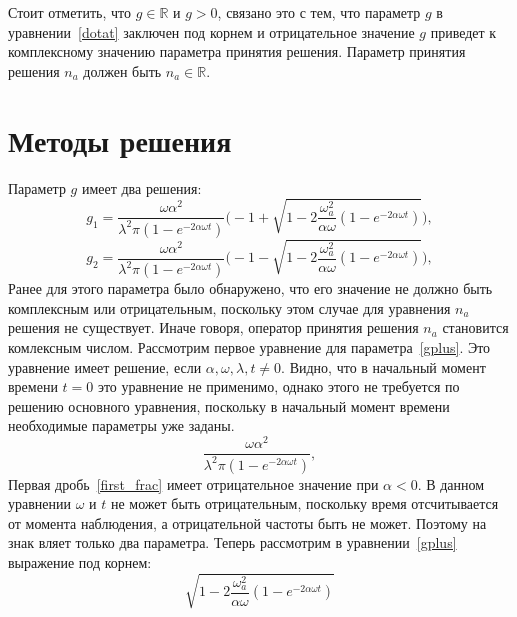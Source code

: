 Стоит отметить, что $g \in \mathbb{R}$ и $g > 0$, связано это с тем, что параметр $g$ в уравнении~\eqref{dotat}
заключен под корнем и отрицательное значение $g$ приведет к комплексному значению параметра принятия решения.
Параметр принятия решения $n_a$ должен быть $n_a \in \mathbb{R}$.

\section{Методы решения}

Параметр $g$ имеет два решения:
\begin{equation}\label{gplus}
    g_{1} = \frac{\omega \alpha^{2}}{\lambda^{2} \pi (1-e^{-2 \alpha \omega t})}
    \Biggl( -1 + \sqrt{1 - 2 \frac{\omega^{2}_{a} }{\alpha \omega} (1-e^{-2 \alpha \omega t})} \Biggr),
\end{equation}
\begin{equation}\label{gminus}
    g_{2} = \frac{\omega \alpha^{2}}{\lambda^{2} \pi (1-e^{-2 \alpha \omega t})}
    \Biggl( -1 - \sqrt{1 - 2 \frac{\omega^{2}_{a} }{\alpha \omega} (1-e^{-2 \alpha \omega t})} \Biggr),
\end{equation}
Ранее для этого параметра было обнаружено, что его значение не должно быть комплексным или отрицательным,
поскольку этом случае для уравнения $n_{a}$ решения не существует.
Иначе говоря, оператор принятия решения $n_{a}$ становится комлексным числом.
Рассмотрим первое уравнение для параметра~\eqref{gplus}.
Это уравнение имеет решение, если $\alpha, \omega, \lambda, t \neq 0$.
Видно, что в начальный момент времени $t = 0$ это уравнение не применимо, однако этого не требуется
по решению основного уравнения, поскольку в начальный момент времени необходимые параметры уже заданы.
\begin{equation}\label{first_frac}
    \frac{\omega \alpha^{2}}{\lambda^{2} \pi (1-e^{-2 \alpha \omega t})},
\end{equation}
Первая дробь~\eqref{first_frac} имеет отрицательное значение при $\alpha < 0$.
В данном уравнении $\omega$ и $t$ не может быть отрицательным, поскольку время отсчитывается от
момента наблюдения, а отрицательной частоты быть не может.
Поэтому на знак вляет только два параметра.
Теперь рассмотрим в уравнении~\eqref{gplus} выражение под корнем:
\begin{equation}\label{last_square}
    \sqrt{1 - 2 \frac{\omega^{2}_{a} }{\alpha \omega} (1-e^{-2 \alpha \omega t})}
\end{equation}
